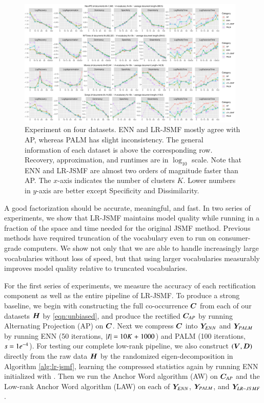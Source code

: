 \begin{figure}[ht]
 	\centering
	\includegraphics[width=0.97\textwidth, trim={1.0cm 1.0cm 1.0cm 0.0cm}]
	{./ch4/pics/real_MethodsPerTopics_new-plain.pdf}
	\caption{Experiment on four datasets. ENN and LR-JSMF mostly agree with AP,
	whereas PALM has slight inconsistency. The general information of each dataset
	is above the corresponding row. Recovery, approximation, and runtimes are in
	$\log_{10}$ scale. Note that ENN and LR-JSMF are almost two orders of
	magnitude faster than AP. The $x$-axis indicates the number of clusters $K$.
	Lower numbers in $y$-axis are better except Specificity and Dissimilarity.} 
	\label{fig:results-topics}
\end{figure}

A good factorization should be accurate, meaningful, and fast.
In two series of experiments, we show that LR-JSMF maintains model quality while
running in a fraction of the space and time needed for the original JSMF method.
Previous methods have required truncation of the vocabulary even to run on
consumer-grade computers. We show not only that we are able to handle
increasingly large vocabularies without loss of speed, but that using larger
vocabularies measurably improves model quality relative to truncated vocabularies.

For the first series of experiments, we measure the accuracy of each
rectification component as well as the entire pipeline of LR-JSMF. To produce a
strong baseline, we begin with constructing the full co-occurrence $\bm{C}$ from
each of our datasets $\bm{H}$ by \eqref{eqn:unbiased}, and produce the rectified
$\bm{C}_{AP}$ by running Alternating Projection (AP) on $\bm{C}$. Next we compress
$\bm{C}$ into $\bm{Y}_{ENN}$ and $\bm{Y}_{PALM}$ by running ENN (50 iterations, $|I|\mathrel{=}
10K \mathrel{+} 1000$) and PALM (100 iterations, $s\mathrel{=}1e^{-4}$). For testing our
complete low-rank pipeline, we also construct $(\bm{V}, \bm{D})$ directly from the raw
data $\bm{H}$ by the randomized eigen-decomposition in Algorithm \ref{alg:lr-jsmf},
learning the compressed statistics  again by running ENN
initialized with \smash{$\BV \sqrt{\BD}$}. Then we run the Anchor Word algorithm
(AW) on $\bm{C}_{AP}$ and the Low-rank Anchor Word algorithm (LAW) on each of $\bm{Y}_
{ENN}$, $\bm{Y}_{PALM}$, and $\bm{Y}_{LR-JSMF}$.

